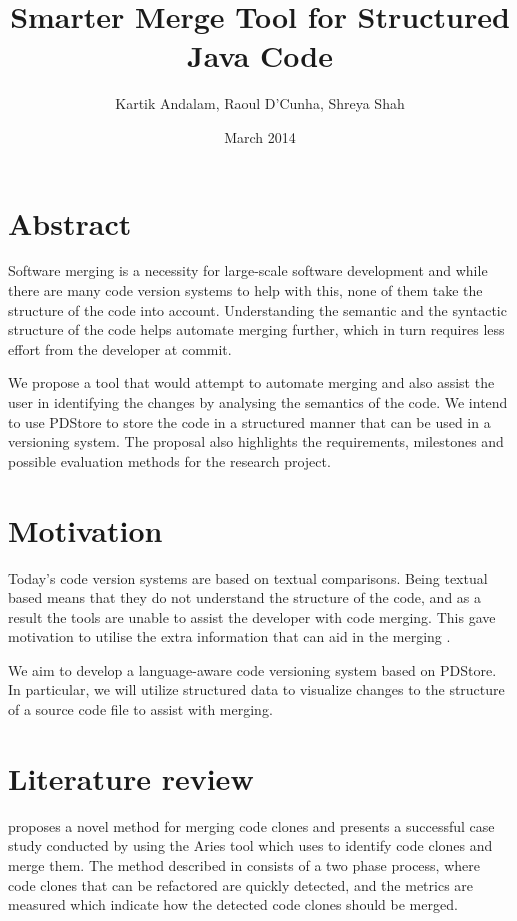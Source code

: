 \documentclass[11pt,twocolumn]{article}
\title{Smarter Merge Tool for Structured Java Code }
\author{Kartik Andalam, Raoul D'Cunha, Shreya Shah }
\date{March 2014}
\begin{document}
\maketitle




\section{Abstract}

Software merging is a necessity for large-scale software development
and while there are many code version systems to help with this, none
of them take the structure of the code into account. Understanding
the semantic and the syntactic structure of the code helps automate
merging further, which in turn requires less effort from the developer
at commit.

We propose a tool that would attempt to automate merging and also
assist the user in identifying the changes by analysing the semantics
of the code. We intend to use PDStore to store the code in a structured
manner that can be used in a versioning system. The proposal also
highlights the requirements, milestones and possible evaluation methods
for the research project.


\section{Motivation}

Today's code version systems are based on textual comparisons. Being
textual based means that they do not understand the structure of the
code, and as a result the tools are unable to assist the developer
with code merging. This gave motivation to utilise the extra information
that can aid in the merging .

We aim to develop a language-aware code versioning system based on
PDStore. In particular, we will utilize structured data to visualize
changes to the structure of a source code file to assist with merging.


\section{Literature review}

\cite{CodeClones} proposes a novel method for merging code clones
and presents a successful case study conducted by using the Aries
tool which uses to identify code clones and merge them. The method
described in \cite{CodeClones} consists of a two phase process, where
code clones that can be refactored are quickly detected, and the metrics
are measured which indicate how the detected code clones should be
merged.
\end{document}
